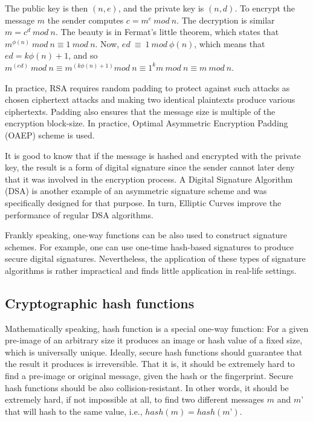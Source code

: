 The public key is then $(n, e)$, and the private key is $(n, d)$. To encrypt the message $m$ 
the sender computes $c= m^e\ mod\ n$. The decryption is similar $m = c^d\ mod\ n$. The beauty is 
in Fermat’s little theorem, which states that $m^{\phi(n)}\ mod\ n \equiv 1\ mod\ n$. 
Now, $ed\ \equiv\ 1\ mod\ \phi(n)$, which means that 
$ed=k\phi(n)+1$, and so $m^{(ed)}\ mod\ n \equiv m^{(k\phi(n)+1)} mod\ n \equiv 1^k m\ mod\ n \equiv m\ mod\ n$. 

In practice, RSA requires random padding to protect against such attacks as chosen ciphertext 
attacks and making two identical plaintexts produce various ciphertexts. Padding also ensures that the 
message size is multiple of the encryption block-size. In practice, Optimal Asymmetric Encryption Padding (OAEP) 
scheme is used.

It is good to know that if the message is hashed and encrypted with the private key, the result is a 
form of digital signature since the sender cannot later deny that it was involved in the encryption 
process. A Digital Signature Algorithm (DSA) is another example of an asymmetric signature scheme and 
was specifically designed for that purpose. In turn, Elliptic Curves improve the performance of regular DSA 
algorithms.

Frankly speaking, one-way functions can be also used to construct signature schemes. 
For example, one can use one-time hash-based signatures to produce secure digital signatures. Nevertheless, 
the application of these types of signature algorithms is rather impractical and finds 
little application in real-life settings.

\subsection{Cryptographic hash functions}

Mathematically speaking, hash function is a special one-way function: For a given  
pre-image of an arbitrary size it produces an image or hash value of a fixed size, 
which is universally unique. Ideally, secure hash functions should guarantee 
that the result it produces is irreversible. That it is, it 
should be extremely hard to find a pre-image or original message, given the 
hash or the fingerprint. Secure hash functions should be also collision-resistant. 
In other words, it should be extremely hard, if not impossible at all, to 
find two different messages $m$ and $m’$ that will hash to the same value, i.e., 
$hash(m)=hash(m’)$.

